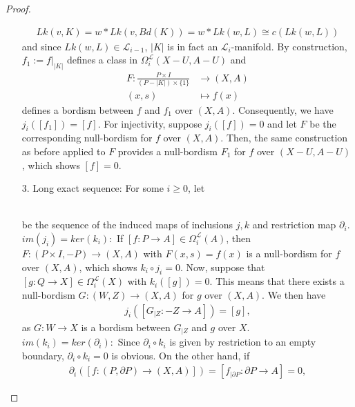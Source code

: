 \documentclass[11pt]{book}
\begin{document}
\begin{proof}
\begin{itemize}
\begin{align*}
Lk(v,K) = w * Lk(v,Bd(K)) = w * Lk(w,L) \cong c(Lk(w,L))
\end{align*}
and since $Lk(w,L) \in \mathcal{L}_{i-1}$, $|K|$ is in fact an $\mathcal{L}_i$-manifold. By construction, $f_1:=f|_{|K|}$ defines a class in $\Omega_i^{\mathcal{L}}(X-U,A-U)$ and 
\begin{align*}
F: \frac{P \times I}{ (P-|K|) \times \{ 1 \} } &\to (X,A) \\
(x,s) &\mapsto f(x)
\end{align*}
defines a bordism between $f$ and $f_1$ over $(X,A)$. Consequently, we have $j_i ([f_1]) = [f]$. For injectivity, suppose $j_i([f])=0$ and let $F$ be the corresponding null-bordism for $f$ over $(X,A)$. Then, the same construction as before applied to $F$ provides a null-bordism $F_1$ for $f$ over $(X-U,A-U)$, which shows $[f]=0$.
\item[3.] Long exact sequence: For some $i \geq 0$, let \\
\\
be the sequence of the induced maps of inclusions $j,k$ and restriction map $\partial_i$. \\
{$im(j_i) = ker(k_i):$} If $[f:P \to A] \in \Omega_i^{\mathcal{L}}(A)$, then $F: (P \times I, -P) \to (X,A)$ with $F(x,s)=f(x)$ is a null-bordism for $f$ over $(X,A)$, which shows $k_i \circ j_i = 0$. Now, suppose that $[g: Q \to X] \in \Omega_i^{\mathcal{L}}(X)$ with $k_i([g])=0$. This means that there exists a null-bordism $G: (W,Z) \to (X,A)$ for $g$ over $(X,A)$. We then have 
\begin{align*}
j_i([G_{|Z}: -Z \to A]) = [g],
\end{align*}
as $G: W \to X$ is a bordism between $G_{|Z}$ and $g$ over $X$. \\
$im(k_i)=ker(\partial_i):$ Since $\partial_i \circ k_i$ is given by restriction to an empty boundary, $\partial_i \circ k_i=0$ is obvious. On the other hand, if 
\begin{align*}
\partial_i([f:(P, \partial P) \to (X,A)])= [f_{| \partial P} : \partial P \to A] = 0,
\end{align*}

\end{itemize}
\end{proof}
\end{document}
